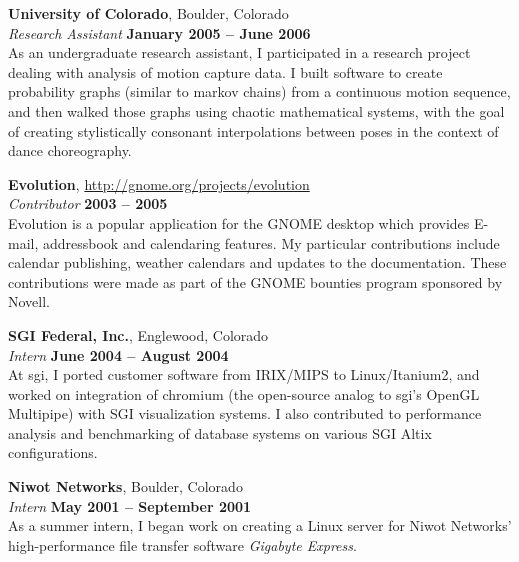 \documentclass[margin,line]{resume}
\begin{document}
\begin{resume}
        {\bf University of Colorado}, Boulder, Colorado \vspace{2mm}\\\vspace{1mm}%
        {\sl Research Assistant} \hfill {\bf January 2005 -- June 2006}\\
        As an undergraduate research assistant, I participated in a research
        project dealing with analysis of motion capture data. I built software to
        create probability graphs (similar to markov chains) from a continuous
        motion sequence, and then walked those graphs using chaotic mathematical
        systems, with the goal of creating stylistically consonant interpolations
        between poses in the context of dance choreography.

        \newpage

        {\bf Evolution}, \href{http://gnome.org/projects/evolution}{http://gnome.org/projects/evolution} \vspace{2mm}\\\vspace{1mm}%
        {\sl Contributor} \hfill {\bf 2003 -- 2005}\\
        Evolution is a popular application for the GNOME desktop which provides
        E-mail, addressbook and calendaring features. My particular contributions
        include calendar publishing, weather calendars and updates to the
        documentation. These contributions were made as part of the GNOME bounties
        program sponsored by Novell.

        {\bf SGI Federal, Inc.}, Englewood, Colorado \vspace{2mm}\\\vspace{1mm}%
        {\sl Intern} \hfill {\bf June 2004 -- August 2004}\\
        At sgi, I ported customer software from IRIX/MIPS to Linux/Itanium2, and
        worked on integration of chromium (the open-source analog to sgi's OpenGL
        Multipipe) with SGI visualization systems. I also contributed to
        performance analysis and benchmarking of database systems on various SGI
        Altix configurations.

        {\bf Niwot Networks}, Boulder, Colorado \vspace{2mm}\\\vspace{1mm}%
        {\sl Intern} \hfill {\bf May 2001 -- September 2001}\\
        As a summer intern, I began work on creating a Linux server for Niwot
        Networks' high-performance file transfer software {\sl Gigabyte Express}.


\end{resume}
\end{document}
